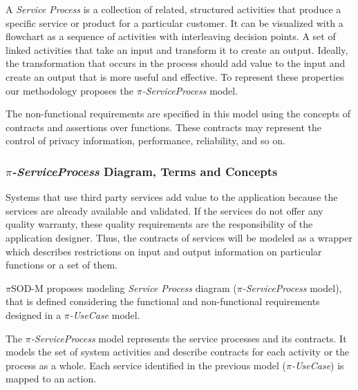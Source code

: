 A \textit{Service Process} is a collection of related, structured activities that produce a specific service or product for
a particular customer. It can be visualized with a flowchart
as a sequence of activities with interleaving decision points.  A set of
linked activities that take an input and transform it to create an output.
Ideally, the transformation that occurs in the process should add value to the
input and create an output that is more useful and effective. To represent these
properties our methodology proposes the \textit{$\pi$-ServiceProcess} model.

The non-functional requirements are specified in this model using the concepts
of contracts and assertions over functions. These contracts may represent the
control of privacy information, performance, reliability, and so on.

 \subsubsection{\textit{$\pi$-ServiceProcess} Diagram, Terms and Concepts} 


Systems that use third party services add value to the application because the
services are already available and validated. If the services do not offer any
quality warranty, these quality requirements are the responsibility of the
application designer. Thus, the contracts of services will be modeled as a
wrapper which describes restrictions on input and output information on
particular functions or a set of them. 


$\pi$SOD-M proposes modeling \textit{Service Process} diagram
(\textit{$\pi$-ServiceProcess} model), that is defined considering the
functional and non-functional requirements designed in a
\textit{$\pi$-UseCase} model.

The \textit{$\pi$-ServiceProcess} model represents the service processes and its
contracts. It models the set of system activities and describe contracts for
each activity or the process as a whole. Each service identified in the previous
model (\textit{$\pi$-UseCase}) is mapped to an action. 

